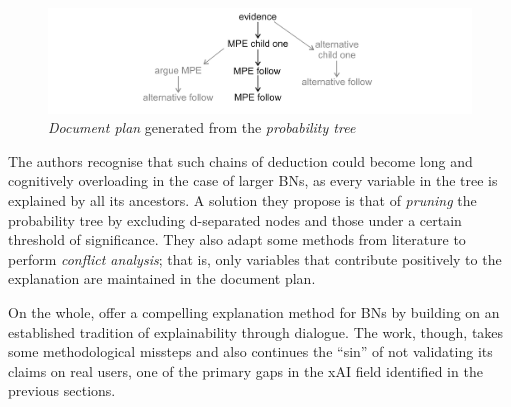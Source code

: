 \begin{figure}[htbp]
\centerline{\includegraphics[width=\textwidth]{literature-review/images/butz-tree}}
\caption{\textit{Document plan} generated from the \textit{probability tree} \citep{Butz2018}}
\label{fig:butz-tree}
\end{figure}

The authors recognise that such chains of deduction could become long and cognitively overloading in the case of larger BNs, as every variable in the tree is explained by all its ancestors.
A solution they propose is that of \textit{pruning} the probability tree by excluding d-separated nodes and those under a certain threshold of significance.
They also adapt some methods from literature to perform \textit{conflict analysis}; that is, only variables that contribute positively to the explanation are maintained in the document plan.

On the whole, \citet{Butz2018} offer a compelling explanation method for BNs by building on an established tradition of explainability through dialogue.
The work, though, takes some methodological missteps and also continues the \enquote{sin} of not validating its claims on real users, one of the primary gaps in the xAI field identified in the previous sections.